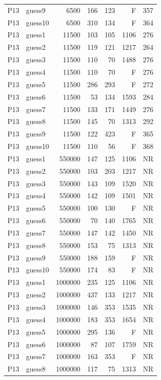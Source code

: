 {\begin{longtable}{llrrrrr}
P13 & guess9 & 6500 & 166 & 123 & F & 357 \\
P13 & guess10 & 6500 & 310 & 134 & F & 364 \\
P13 & guess1 & 11500 & 103 & 105 & 1106 & 276 \\
P13 & guess2 & 11500 & 119 & 121 & 1217 & 264 \\
P13 & guess3 & 11500 & 110 & 70 & 1488 & 276 \\
P13 & guess4 & 11500 & 110 & 70 & F & 276 \\
P13 & guess5 & 11500 & 286 & 293 & F & 272 \\
P13 & guess6 & 11500 & 53 & 134 & 1593 & 284 \\
P13 & guess7 & 11500 & 133 & 171 & 1449 & 276 \\
P13 & guess8 & 11500 & 145 & 70 & 1313 & 292 \\
P13 & guess9 & 11500 & 122 & 423 & F & 365 \\
P13 & guess10 & 11500 & 110 & 56 & F & 368 \\
P13 & guess1 & 550000 & 147 & 125 & 1106 & NR \\
P13 & guess2 & 550000 & 103 & 203 & 1217 & NR \\
P13 & guess3 & 550000 & 143 & 109 & 1520 & NR \\
P13 & guess4 & 550000 & 142 & 109 & 1501 & NR \\
P13 & guess5 & 550000 & 100 & 130 & F & NR \\
P13 & guess6 & 550000 & 70 & 140 & 1765 & NR \\
P13 & guess7 & 550000 & 147 & 142 & 1450 & NR \\
P13 & guess8 & 550000 & 153 & 75 & 1313 & NR \\
P13 & guess9 & 550000 & 188 & 159 & F & NR \\
P13 & guess10 & 550000 & 174 & 83 & F & NR \\
P13 & guess1 & 1000000 & 235 & 125 & 1106 & NR \\
P13 & guess2 & 1000000 & 437 & 133 & 1217 & NR \\
P13 & guess3 & 1000000 & 146 & 353 & 1535 & NR \\
P13 & guess4 & 1000000 & 183 & 353 & 1654 & NR \\
P13 & guess5 & 1000000 & 295 & 136 & F & NR \\
P13 & guess6 & 1000000 & 87 & 107 & 1759 & NR \\
P13 & guess7 & 1000000 & 163 & 353 & F & NR \\
P13 & guess8 & 1000000 & 117 & 75 & 1313 & NR \\

\end{longtable}}
